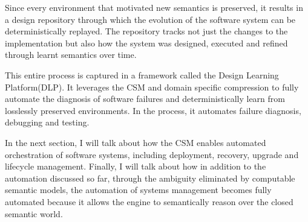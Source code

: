 Since every environment that motivated new semantics is preserved, it results in a design repository through which the evolution of the software system can be deterministically replayed. The repository tracks not just the changes to the implementation but also how the system was designed, executed and refined through learnt semantics over time.

This entire process is captured in a framework called the Design Learning Platform(DLP). It leverages the CSM and domain specific compression to fully automate the diagnosis of software failures and deterministically learn from losslessly preserved environments. In the process, it automates failure diagnosis, debugging and testing.

In the next section, I will talk about how the CSM enables automated orchestration of software systems, including deployment, recovery, upgrade and lifecycle management. Finally, I will talk about how in addition to the automation discussed so far, through the ambiguity eliminated by computable semantic models, the automation of systems management becomes fully automated because it allows the engine to semantically reason over the closed semantic world.